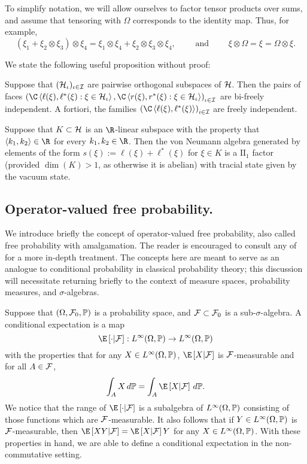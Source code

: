 To simplify notation, we will allow ourselves to factor tensor products over sums, and assume that tensoring with $\Omega$ corresponds to the identity map.
Thus, for example,
$$(\xi_1 + \xi_2\otimes\xi_3)\otimes \xi_4 = \xi_1\otimes\xi_4 + \xi_2\otimes\xi_3\otimes\xi_4,
\qquad\text{ and }\qquad \xi\otimes\Omega = \xi = \Omega\otimes\xi.$$

We state the following useful proposition without proof:
\begin{proposition}
	Suppose that $(\cH_\iota)_{\iota\in\I}$ are pairwise orthogonal subspaces of $\cH$.
	Then the pairs of faces $\paren{\C\ang{\ell(\xi), \ell^*(\xi) : \xi \in \cH_\iota}, \C\ang{r(\xi), r^*(\xi) : \xi \in \cH_\iota}}_{\iota\in\I}$ are bi-freely independent.
	A fortiori, the families $\paren{\C\ang{\ell(\xi), \ell^*(\xi)}}_{i\in\I}$ are freely independent.
\end{proposition}

Suppose that $K \subset \cH$ is an $\R$-linear subspace with the property that $\ang{k_1, k_2} \in \R$ for every $k_1, k_2 \in \R$.
Then the von Neumann algebra generated by elements of the form $s(\xi) := \ell(\xi) + \ell^*(\xi)$ for $\xi \in K$ is a $\mathrm{II}_1$ factor (provided $\dim(K) > 1$, as otherwise it is abelian) with tracial state given by the vacuum state.

\subsection{Operator-valued free probability.}
We introduce briefly the concept of operator-valued free probability, also called free probability with amalgamation.
The reader is encouraged to consult any of \cite{nica2006lectures,nica2002operator,speicher1998combinatorial} for a more in-depth treatment.
The concepts here are meant to serve as an analogue to conditional probability in classical probability theory; this discussion will necessitate returning briefly to the context of measure spaces, probability measures, and $\sigma$-algebras.

Suppose that $(\Omega, \cF_0, \P)$ is a probability space, and $\cF \subset \cF_0$ is a sub-$\sigma$-algebra.
A conditional expectation is a map
$$\E\sq{\cdot | \cF} : L^{\infty}(\Omega, \P) \to L^{\infty}(\Omega, \P)$$
with the properties that for any $X \in L^\infty(\Omega, \P)$, $\E\sq{X | \cF}$ is $\cF$-measurable and for all $A \in \cF$,
$$\int_A X\,d\P = \int_A \E\sq{X | \cF}\,d\P.$$
We notice that the range of $\E\sq{\cdot | \cF}$ is a subalgebra of $L^\infty(\Omega, \P)$ consisting of those functions which are $\cF$-measurable.
It also follows that if $Y \in L^\infty(\Omega, \P)$ is $\cF$-measurable, then $\E\sq{XY | \cF} = \E\sq{X | \cF}Y$ for any $X \in L^\infty(\Omega, \P)$.
With these properties in hand, we are able to define a conditional expectation in the non-commutative setting.

